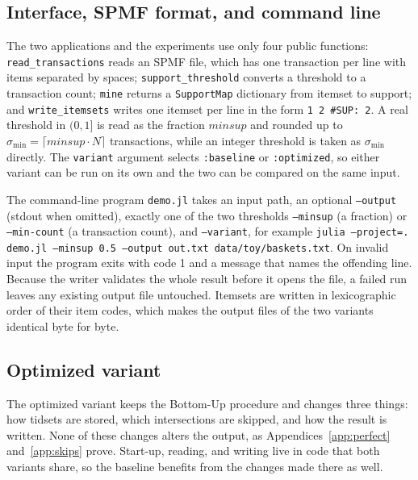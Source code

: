 \subsection{Interface, SPMF format, and command line}
The two applications and the experiments use only four public functions:
\texttt{read\_transactions} reads an SPMF file, which has one transaction per line with
items separated by spaces; \texttt{support\_threshold} converts a threshold to a
transaction count; \texttt{mine} returns a \texttt{SupportMap} dictionary from itemset to
support; and \texttt{write\_itemsets} writes one itemset per line in the form
\texttt{1 2 \#SUP: 2}. A real threshold in $(0, 1]$ is read as the fraction
$\mathit{minsup}$ and rounded up to $\sigma_{\min} = \lceil \mathit{minsup} \cdot N \rceil$
transactions, while an integer threshold is taken as $\sigma_{\min}$ directly. The
\texttt{variant} argument selects \texttt{:baseline} or \texttt{:optimized}, so either
variant can be run on its own and the two can be compared on the same input.

The command-line program \texttt{demo.jl} takes an input path, an optional
\texttt{--output} (stdout when omitted), exactly one of the two thresholds \texttt{--minsup} (a fraction) or
\texttt{--min-count} (a transaction count), and \texttt{--variant}, for example
\texttt{julia --project=. demo.jl --minsup 0.5 --output out.txt data/toy/baskets.txt}.
On invalid input the program exits with code 1 and a message that names the offending
line. Because the writer validates the whole result before it opens the file, a failed
run leaves any existing output file untouched. Itemsets are written in lexicographic order
of their item codes, which makes the output files of the two variants identical byte for
byte.

\subsection{Optimized variant}
\label{sec:optimized}
The optimized variant keeps the Bottom-Up procedure and changes three things: how
tidsets are stored, which intersections are skipped, and how the result is written. None
of these changes alters the output, as Appendices~\ref{app:perfect} and~\ref{app:skips}
prove. Start-up, reading, and writing live in code that both variants share, so the
baseline benefits from the changes made there as well.

